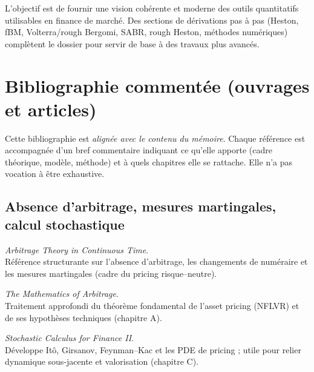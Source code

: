 \documentclass[11pt,a4paper]{article}
\newcommand{\1}{\mathbf{1}}
\begin{document}
L'objectif est de fournir une vision cohérente et moderne des outils quantitatifs
utilisables en finance de marché.
Des sections de d\'erivations pas \`a pas (Heston, fBM, Volterra/rough Bergomi, SABR, rough Heston,
m\'ethodes num\'eriques) compl\`etent le dossier pour servir de base \`a des travaux plus avanc\'es.


\section{Bibliographie comment\'ee (ouvrages et articles)}

Cette bibliographie est \emph{align\'ee avec le contenu du m\'emoire}. Chaque r\'ef\'erence est accompagn\'ee d'un bref commentaire indiquant
ce qu'elle apporte (cadre th\'eorique, mod\`ele, m\'ethode) et \`a quels chapitres elle se rattache. Elle n'a pas vocation \`a \^etre exhaustive.

\subsection{Absence d'arbitrage, mesures martingales, calcul stochastique}

\begin{description}[style=nextline,leftmargin=2.8cm]
  \item[\textbf{Björk, T. (2009).}] \emph{Arbitrage Theory in Continuous Time}.\\
  R\'ef\'erence structurante sur l'absence d'arbitrage, les changements de num\'eraire et les mesures martingales (cadre du pricing risque--neutre).

  \item[\textbf{Delbaen, F., Schachermayer, W. (2006).}] \emph{The Mathematics of Arbitrage}.\\
  Traitement approfondi du th\'eor\`eme fondamental de l'asset pricing (NFLVR) et de ses hypoth\`eses techniques (chapitre A).

  \item[\textbf{Shreve, S. (2004).}] \emph{Stochastic Calculus for Finance II}.\\
  D\'eveloppe It\^o, Girsanov, Feynman--Kac et les PDE de pricing ; utile pour relier dynamique sous-jacente et valorisation (chapitre C).
\end{description}
\end{document}
